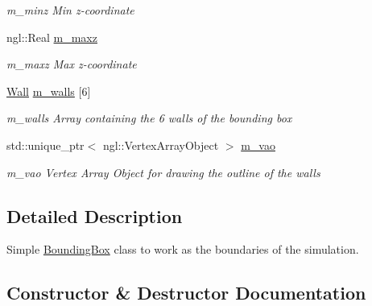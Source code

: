 \begin{DoxyCompactItemize}
\begin{DoxyCompactList}\small\item\em m\+\_\+minz Min z-\/coordinate \end{DoxyCompactList}\item 
ngl\+::\+Real \hyperlink{classBoundingBox_a8e35ea84f95c8adaa0c68add6df2c0d3}{m\+\_\+maxz}\hypertarget{classBoundingBox_a8e35ea84f95c8adaa0c68add6df2c0d3}{}\label{classBoundingBox_a8e35ea84f95c8adaa0c68add6df2c0d3}

\begin{DoxyCompactList}\small\item\em m\+\_\+maxz Max z-\/coordinate \end{DoxyCompactList}\item 
\hyperlink{structWall}{Wall} \hyperlink{classBoundingBox_a8c69e197fe1adf9428b892f2736c5508}{m\+\_\+walls} \mbox{[}6\mbox{]}\hypertarget{classBoundingBox_a8c69e197fe1adf9428b892f2736c5508}{}\label{classBoundingBox_a8c69e197fe1adf9428b892f2736c5508}

\begin{DoxyCompactList}\small\item\em m\+\_\+walls Array containing the 6 walls of the bounding box \end{DoxyCompactList}\item 
std\+::unique\+\_\+ptr$<$ ngl\+::\+Vertex\+Array\+Object $>$ \hyperlink{classBoundingBox_a943ca34be576502ae40b7236972e78b7}{m\+\_\+vao}\hypertarget{classBoundingBox_a943ca34be576502ae40b7236972e78b7}{}\label{classBoundingBox_a943ca34be576502ae40b7236972e78b7}

\begin{DoxyCompactList}\small\item\em m\+\_\+vao Vertex Array Object for drawing the outline of the walls \end{DoxyCompactList}\end{DoxyCompactItemize}


\subsection{Detailed Description}
Simple \hyperlink{classBoundingBox}{Bounding\+Box} class to work as the boundaries of the simulation. 

\subsection{Constructor \& Destructor Documentation}

